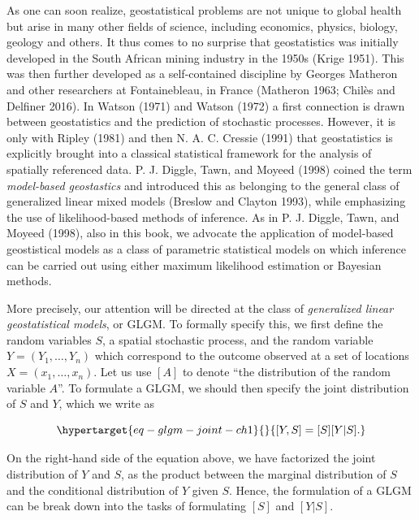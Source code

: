 \documentclass[
  letterpaper,
]{krantz}
\begin{document}
As one can soon realize, geostatistical problems are not unique to
global health but arise in many other fields of science, including
economics, physics, biology, geology and others. It thus comes to no
surprise that geostatistics was initially developed in the South African
mining industry in the 1950s (Krige 1951). This was then further
developed as a self-contained discipline by Georges Matheron and other
researchers at Fontainebleau, in France (Matheron 1963; Chilès and
Delfiner 2016). In Watson (1971) and Watson (1972) a first connection is
drawn between geostatistics and the prediction of stochastic processes.
However, it is only with Ripley (1981) and then N. A. C. Cressie (1991)
that geostatistics is explicitly brought into a classical statistical
framework for the analysis of spatially referenced data. P. J. Diggle,
Tawn, and Moyeed (1998) coined the term \emph{model-based geostastics}
and introduced this as belonging to the general class of generalized
linear mixed models (Breslow and Clayton 1993), while emphasizing the
use of likelihood-based methods of inference. As in P. J. Diggle, Tawn,
and Moyeed (1998), also in this book, we advocate the application of
model-based geostistical models as a class of parametric statistical
models on which inference can be carried out using either maximum
likelihood estimation or Bayesian methods.

More precisely, our attention will be directed at the class of
\emph{generalized linear geostatistical models}, or GLGM. To formally
specify this, we first define the random variables \(S\), a spatial
stochastic process, and the random variable \(Y= (Y_1, \ldots, Y_n)\)
which correspond to the outcome observed at a set of locations
\(X = (x_1, \ldots, x_n)\). Let us use \([A]\) to denote ``the
distribution of the random variable \(A\)''. To formulate a GLGM, we
should then specify the joint distribution of \(S\) and \(Y\), which we
write as

\begin{equation}\protect\hypertarget{eq-glgm-joint-ch1}{}{
[Y, S] = [S] [Y | S].
}\label{eq-glgm-joint-ch1}\end{equation}

On the right-hand side of the equation above, we have factorized the
joint distribution of \(Y\) and \(S\), as the product between the
marginal distribution of \(S\) and the conditional distribution of \(Y\)
given \(S\). Hence, the formulation of a GLGM can be break down into the
tasks of formulating \([S]\) and \([Y | S]\).
\end{document}
